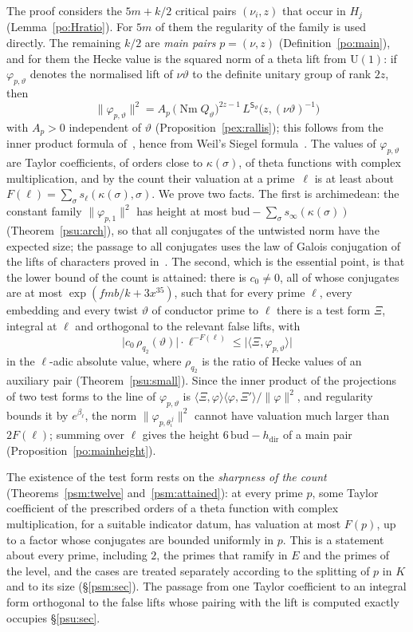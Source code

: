 \documentclass[10pt]{amsart}
\theoremstyle{definition}
\theoremstyle{remark}
\begin{document}
The proof considers the $5m+k/2$ critical pairs $(\nu_i,z)$ that occur in $H_j$
(Lemma~\ref{po:Hratio}). For $5m$ of them the regularity of the family is used directly. The
remaining $k/2$ are \emph{main pairs} $p=(\nu,z)$ (Definition~\ref{po:main}), and for them the
Hecke value is the squared norm of a theta lift from $\mathrm U(1)$: if $\varphi_{p,\vartheta}$
denotes the normalised lift of $\nu\vartheta$ to the definite unitary group of rank $2z$, then
\[
\|\varphi_{p,\vartheta}\|^2=A_p\,\bigl(\operatorname{Nm}Q_\vartheta\bigr)^{2z-1}\,
L^{\mathsf S_\vartheta}\bigl(z,(\nu\vartheta)^{-1}\bigr)
\]
with $A_p>0$ independent of $\vartheta$ (Proposition~\ref{pex:rallis}); this follows from the
inner product formula of~\cite{P53}, hence from Weil's Siegel formula~\cite{WeilSiegel}. The
values of $\varphi_{p,\vartheta}$ are Taylor coefficients, of orders close to $\kappa(\sigma)$,
of theta functions with complex multiplication, and by the count their valuation at a
prime~$\ell$ is at least about $F(\ell)=\sum_\sigma s_\ell(\kappa(\sigma),\sigma)$. We prove two
facts. The first is archimedean: the constant family $\|\varphi_{p,1}\|^2$ has height at most
$\mathrm{bud}-\sum_\sigma s_\infty(\kappa(\sigma))$ (Theorem~\ref{psu:arch}), so that all conjugates
of the untwisted norm have the expected size; the passage to all conjugates uses the law of Galois
conjugation of the lifts of characters proved in~\cite{P53}. The second, which is the essential
point, is that the lower bound of the count is attained: there is $c_0\ne0$, all of
whose conjugates are at most $\exp(fmb/k+3x^{35})$, such that for every prime $\ell$, every
embedding and every twist $\vartheta$ of conductor prime to $\ell$ there is a test form $\Xi$,
integral at $\ell$ and orthogonal to the relevant false lifts, with
\[
\bigl|c_0\,\rho_{q_2}(\vartheta)\bigr|\cdot\ell^{-F(\ell)}\le\bigl|\langle\Xi,\varphi_{p,\vartheta}
\rangle\bigr|
\]
in the $\ell$-adic absolute value, where $\rho_{q_2}$ is the ratio of Hecke values of an
auxiliary pair (Theorem~\ref{psu:small}). Since the inner product of the projections of two test
forms to the line of $\varphi_{p,\vartheta}$ is $\langle\Xi,\varphi\rangle\langle\varphi,\Xi'\rangle/\|\varphi\|^2$, and regularity bounds it by $e^{\beta_\ell}$, the norm
$\|\varphi_{p,\theta_\iota^{\,j}}\|^2$ cannot have valuation much larger than $2F(\ell)$; summing
over $\ell$ gives the height $6\,\mathrm{bud}-h_{\mathrm{dir}}$ of a main pair
(Proposition~\ref{po:mainheight}).

The existence of the test form rests on the \emph{sharpness of the count}
(Theorems~\ref{psm:twelve} and~\ref{psm:attained}): at every prime $p$, some Taylor coefficient of
the prescribed orders of a theta function with complex multiplication, for a suitable indicator
datum, has valuation at most $F(p)$, up to a factor whose conjugates are bounded uniformly in
$p$. This is a statement about every prime, including $2$, the primes that ramify in $E$ and the
primes of the level, and the cases are treated separately according to the splitting of $p$ in
$K$ and to its size (\S\ref{psm:sec}). The passage from one Taylor coefficient to an integral form orthogonal
to the false lifts whose pairing with the lift is computed exactly occupies
\S\ref{psu:sec}.
\end{document}
